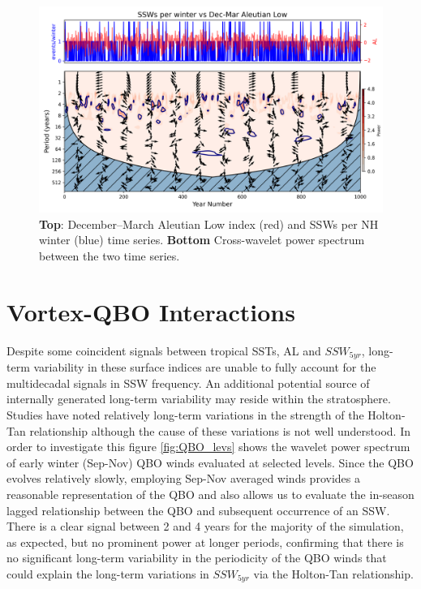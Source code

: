 \begin{figure}[h!]
\begin{center}
\includegraphics[width = \linewidth]{Figures/Figures-origins/SSWs_vs_AL_wavelet_unsmoothed.png}
\caption{\textbf{Top}: December–March Aleutian Low index (red) and SSWs per NH winter (blue) time series. \textbf{Bottom} Cross-wavelet power spectrum between the two time series.}
\label{fig:AL_unsmoothed_wavelet}
\end{center}
\end{figure}


\section{Vortex-QBO Interactions}
Despite some coincident signals between tropical SSTs, AL and $SSW_{5yr}$, long-term variability in these surface indices are unable to fully account for the  multidecadal signals in SSW frequency. An additional potential source of internally generated long-term variability may reside within the stratosphere. Studies have noted relatively long-term variations in the strength of the Holton-Tan relationship \citep{luDecadalscale2008,luMechanisms2014,ospreyClimatology2010} although the cause of these variations is not well understood. In order to investigate this figure \ref{fig:QBO_levs} shows the wavelet power spectrum of early winter (Sep-Nov) QBO winds evaluated at selected levels. Since the QBO evolves relatively slowly, employing Sep-Nov averaged winds provides a reasonable representation of the QBO and also allows us to evaluate the in-season lagged relationship between the QBO and subsequent occurrence of an SSW. There is a clear signal between 2 and 4 years for the majority of the simulation, as expected, but no prominent power at longer periods,  confirming that there is no significant long-term variability in the periodicity of the QBO winds that could explain the long-term variations in $SSW_{5yr}$ via the Holton-Tan relationship.

